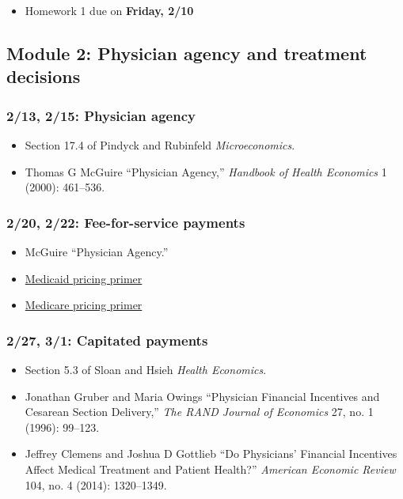 \documentclass[11pt,]{article}
\providecommand{\tightlist}{%
  \setlength{\itemsep}{0pt}\setlength{\parskip}{0pt}}
\begin{document}
\begin{itemize}
\tightlist
\item
  Homework 1 due on \textbf{Friday, 2/10}
\end{itemize}

\hypertarget{module-2-physician-agency-and-treatment-decisions}{%
\subsection{Module 2: Physician agency and treatment
decisions}\label{module-2-physician-agency-and-treatment-decisions}}

\hypertarget{physician-agency}{%
\subsubsection{2/13, 2/15: Physician agency}\label{physician-agency}}

\begin{itemize}
\tightlist
\item
  Section 17.4 of Pindyck and Rubinfeld \emph{Microeconomics}.
\item
  Thomas G McGuire {``Physician Agency,''} \emph{Handbook of Health
  Economics} 1 (2000): 461--536.
\end{itemize}

\hypertarget{fee-for-service-payments}{%
\subsubsection{2/20, 2/22: Fee-for-service
payments}\label{fee-for-service-payments}}

\begin{itemize}
\tightlist
\item
  McGuire {``Physician Agency.''}
\item
  \href{https://www.macpac.gov/medicaid-101/}{Medicaid pricing primer}
\item
  \href{https://fas.org/sgp/crs/misc/R40425.pdf}{Medicare pricing
  primer}
\end{itemize}

\hypertarget{capitated-payments}{%
\subsubsection{2/27, 3/1: Capitated payments}\label{capitated-payments}}

\begin{itemize}
\tightlist
\item
  Section 5.3 of Sloan and Hsieh \emph{Health Economics}.
\item
  Jonathan Gruber and Maria Owings {``Physician Financial Incentives and
  Cesarean Section Delivery,''} \emph{The RAND Journal of Economics} 27,
  no. 1 (1996): 99--123.
\item
  Jeffrey Clemens and Joshua D Gottlieb {``Do {Physicians}' {Financial}
  {Incentives} {Affect} {Medical} {Treatment} and {Patient} {Health}?''}
  \emph{American Economic Review} 104, no. 4 (2014): 1320--1349.
\end{itemize}
\end{document}
